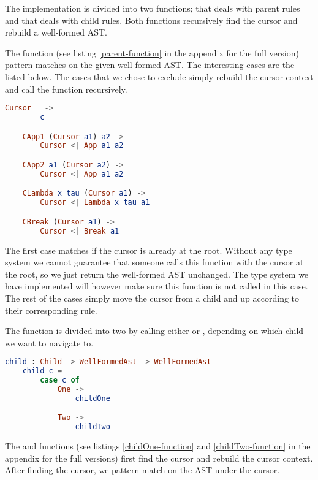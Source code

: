 The implementation is divided into two functions;  that deals with
parent rules and  that deals with child rules. Both functions
recursively find the cursor and rebuild a well-formed AST.

The  function (see listing \ref{parent-function} in the appendix for
the full version) pattern matches on the given well-formed AST. The interesting
cases are the listed below. The cases that we chose to exclude simply rebuild
the cursor context and call the function recursively.

\begin{lstlisting}[language=elm,%
                   label="parent-function",%
                   gobble=4,%
                   ]
    Cursor _ ->
        c

    CApp1 (Cursor a1) a2 ->
        Cursor <| App a1 a2

    CApp2 a1 (Cursor a2) ->
        Cursor <| App a1 a2

    CLambda x tau (Cursor a1) ->
        Cursor <| Lambda x tau a1

    CBreak (Cursor a1) ->
        Cursor <| Break a1
\end{lstlisting}

The first case matches if the cursor is already at the root. Without any type
system we cannot guarantee that someone calls this function with the cursor at
the root, so we just return the well-formed AST unchanged. The type system we
have implemented will however make sure this function is not called in this
case. The rest of the cases simply move the cursor from a child and up according
to their corresponding rule.

The  function is divided into two by calling either  or
, depending on which child we want to navigate to.

\begin{lstlisting}[language=elm,%
                   label="child-function",%
                   gobble=4,%
                   ]
    child : Child -> WellFormedAst -> WellFormedAst
    child c =
        case c of
            One ->
                childOne

            Two ->
                childTwo
\end{lstlisting}

The  and  functions (see listings
\ref{childOne-function} and \ref{childTwo-function} in the appendix for the full
versions) first find the cursor and rebuild the cursor context. After finding
the cursor, we pattern match on the AST under the cursor.

